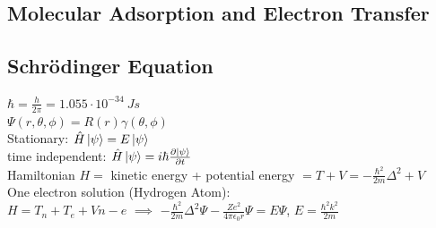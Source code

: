 \documentclass[9pt]{article}
\begin{document}
\begin{multicols}{2}
    \section{Molecular Adsorption and Electron Transfer}
        \subsection{Schrödinger Equation}
        $\hbar = \frac{h}{2\pi}=1.055\cdot 10^{-34}\ Js$\\
        $\Psi(r,\theta, \phi)=R(r)\gamma(\theta,\phi)$\\
        Stationary: $\hat{H}\ket{\psi}=E\ket{\psi}$\\
        	time independent: $\hat{H}\ket{\psi}=i \hbar \frac{\partial \ket{\psi}}{\partial t}$\\
        Hamiltonian $H=$ kinetic energy + potential energy $= T+V=-\frac{\hbar ^2}{2m} \Delta ^2+V$\\
        One electron solution (Hydrogen Atom):\\
        $H=T_n + T_e+V{n-e}$ $\implies$ $-\frac{\hbar ^2}{2m}\Delta ^2 \Psi - \frac{Z e^2}{4 \pi \epsilon_0 r}\Psi=E\Psi$, $E=\frac{\hbar ^2 k^2}{2m}$\\
       
       
        

\end{multicols}
\end{document}
